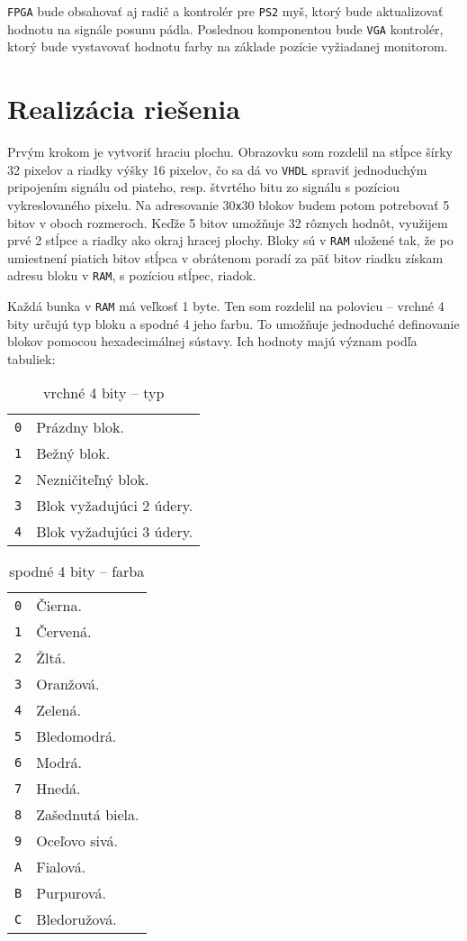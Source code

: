 \documentclass[12pt,a4paper,titlepage,final]{article}
\begin{document}
\texttt{FPGA} bude obsahovať aj radič a kontrolér pre \texttt{PS2} myš, ktorý bude aktualizovať hodnotu na signále posunu pádla. Poslednou
komponentou bude \texttt{VGA} kontrolér, ktorý bude vystavovať hodnotu farby na základe pozície vyžiadanej monitorom.

\section{Realizácia riešenia}
Prvým krokom je vytvoriť hraciu plochu. Obrazovku som rozdelil na stĺpce šírky 32 pixelov a riadky výšky 16 pixelov, čo sa dá 
vo \texttt{VHDL} spraviť jednoduchým pripojením signálu od piateho, resp. štvrtého bitu zo signálu s pozíciou vykreslovaného pixelu.
Na adresovanie $30$\texttt{x}$30$ blokov budem potom potrebovať 5 bitov v oboch rozmeroch. Keďže 5 bitov umožňuje 32 rôznych
hodnôt, využijem prvé 2 stĺpce a riadky ako okraj hracej plochy. Bloky sú v \texttt{RAM} uložené tak, že po umiestnení piatich bitov
stĺpca v obrátenom poradí za päť bitov riadku získam adresu bloku v \texttt{RAM}, s pozíciou stĺpec, riadok.

Každá bunka v \texttt{RAM} má veľkosť 1 byte. Ten som rozdelil na polovicu -- vrchné 4 bity určujú typ bloku a spodné 4 jeho farbu.
To umožňuje jednoduché definovanie blokov pomocou hexadecimálnej sústavy. Ich hodnoty majú význam podľa tabuliek:
\begin{table}[h]
\begin{tabularx}{\linewidth}{ l X }
\texttt{0} & Prázdny blok.\\
\texttt{1} & Bežný blok.\\
\texttt{2} & Nezničiteľný blok.\\
\texttt{3} & Blok vyžadujúci 2 údery.\\
\texttt{4} & Blok vyžadujúci 3 údery.
\end{tabularx}
\caption{vrchné 4 bity -- typ}
\end{table}

\begin{table}[h]
\begin{tabularx}{\linewidth}{ l X }
\texttt{0} & Čierna.\\
\texttt{1} & Červená.\\
\texttt{2} & Žltá.\\
\texttt{3} & Oranžová.\\
\texttt{4} & Zelená.\\
\texttt{5} & Bledomodrá.\\
\texttt{6} & Modrá.\\
\texttt{7} & Hnedá.\\
\texttt{8} & Zašednutá biela.\\
\texttt{9} & Oceľovo sivá.\\
\texttt{A} & Fialová.\\
\texttt{B} & Purpurová.\\
\texttt{C} & Bledoružová.
\end{tabularx}
\caption{spodné 4 bity -- farba}
\end{table}
\end{document}
